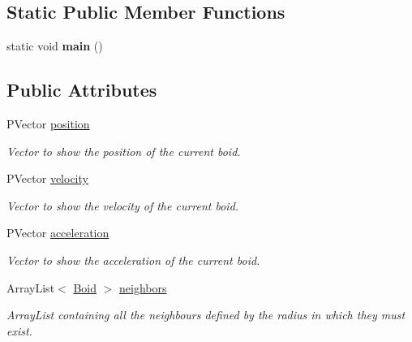 \subsection*{Static Public Member Functions}
\begin{DoxyCompactItemize}
\item 
\mbox{\label{class_boid_a350adf423a0d66855334ed5be8a25658}} 
static void {\bfseries main} ()
\end{DoxyCompactItemize}
\subsection*{Public Attributes}
\begin{DoxyCompactItemize}
\item 
\mbox{\label{class_boid_a1c665a132b8231e06e6762fb1c02f369}} 
P\+Vector \mbox{\hyperlink{class_boid_a1c665a132b8231e06e6762fb1c02f369}{position}}
\begin{DoxyCompactList}\small\item\em Vector to show the position of the current boid. \end{DoxyCompactList}\item 
\mbox{\label{class_boid_a1229124743705891df66f137e9aa032e}} 
P\+Vector \mbox{\hyperlink{class_boid_a1229124743705891df66f137e9aa032e}{velocity}}
\begin{DoxyCompactList}\small\item\em Vector to show the velocity of the current boid. \end{DoxyCompactList}\item 
\mbox{\label{class_boid_a945a8f4e1ef0c76118c44d5d735a0d89}} 
P\+Vector \mbox{\hyperlink{class_boid_a945a8f4e1ef0c76118c44d5d735a0d89}{acceleration}}
\begin{DoxyCompactList}\small\item\em Vector to show the acceleration of the current boid. \end{DoxyCompactList}\item 
\mbox{\label{class_boid_aab42048b1c1f3efc848eac0f69d1a930}} 
Array\+List$<$ \mbox{\hyperlink{class_boid}{Boid}} $>$ \mbox{\hyperlink{class_boid_aab42048b1c1f3efc848eac0f69d1a930}{neighbors}}
\begin{DoxyCompactList}\small\item\em Array\+List containing all the neighbours defined by the radius in which they must exist. \end{DoxyCompactList}\item 

\end{DoxyCompactItemize}
